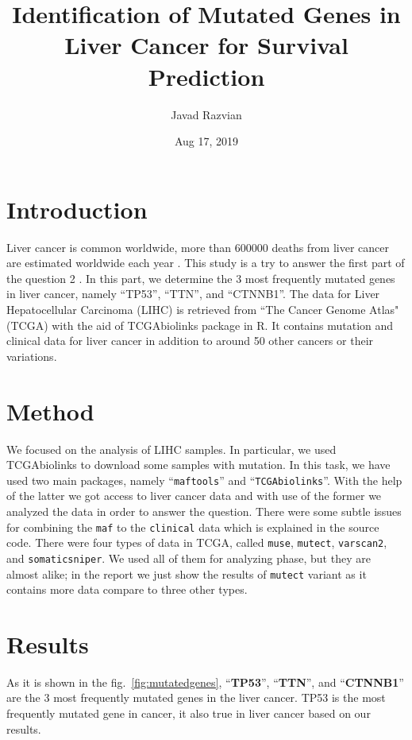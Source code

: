 \documentclass[12pt, ]{article}
\title{Identification of Mutated Genes in Liver Cancer for Survival Prediction}
\author{Javad Razvian}
\date{Aug 17, 2019}
\begin{document}
\maketitle

\section{Introduction}
Liver cancer is common worldwide, more than 600000 deaths from liver cancer are estimated worldwide each year \cite{bib:FMG}.
This study is a try to answer the first part of the question 2 \cite{bib:rtest}. In this part, we determine the 3 most frequently mutated genes in liver cancer, namely ``TP53'', ``TTN'', and ``CTNNB1''. 
The data for Liver Hepatocellular Carcinoma (LIHC)
 is retrieved from  ``The Cancer Genome Atlas" (TCGA)  with the aid of TCGAbiolinks package in R. 
It contains mutation and clinical data for liver cancer in addition to around 50 other cancers or their variations. 

\section{Method}
We focused on the analysis of LIHC samples. In particular, we used TCGAbiolinks to download some samples with mutation. 
In this task, we have used two main packages, namely ``\texttt{maftools}''\cite{bib:maftools} and ``\texttt{TCGAbiolinks}''\cite{bib:tcga}. 
With the help of the latter we got access to liver cancer data and with use of the former we analyzed the data in order to answer the question. 
There were some subtle issues for combining the \texttt{maf} to the \texttt{clinical} data which is explained in the source code. 
There were four types of data in TCGA, called \texttt{muse}, \texttt{mutect}, \texttt{varscan2}, and \texttt{somaticsniper}.
We used all of them for analyzing phase, but they are almost alike; in the report we just show the results of \texttt{mutect} variant as it 
contains more data compare to three other types. 

\section{Results}
As it is shown in the fig.~\ref{fig:mutatedgenes}, ``\textbf{TP53}'', ``\textbf{TTN}'', and ``\textbf{CTNNB1}'' are the 3 most frequently mutated genes in the liver cancer. 
TP53 is the most frequently mutated gene in cancer\cite{bib:BCSP}, it also true in liver cancer based on our results.
\end{document}
